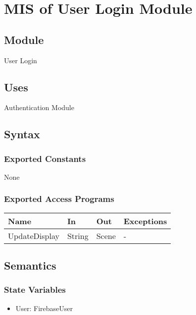 \documentclass[12pt, titlepage]{article}
\begin{document}
\newpage

\section{MIS of User Login Module} \label{mLogin}

\subsection{Module}

User Login

\subsection{Uses}

Authentication Module

\subsection{Syntax}

\subsubsection{Exported Constants}

None

\subsubsection{Exported Access Programs}

\begin{center}
	\begin{tabular}{p{4cm} p{2cm} p{4cm} p{4cm}}
	\hline
	\textbf{Name} & \textbf{In} & \textbf{Out} & \textbf{Exceptions} \\
	\hline
	UpdateDisplay & String & Scene & - \\
	\hline
	\end{tabular}
\end{center}

\subsection{Semantics}

\subsubsection{State Variables}

\begin{itemize}
\item User: FirebaseUser
\end{itemize}
\end{document}
